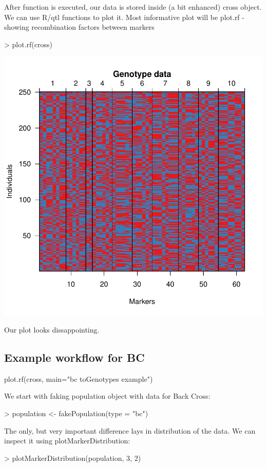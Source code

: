 \documentclass{article}
\begin{document}
{\noindent}After function is executed, our data is stored inside (a bit enhanced) cross object. We can use R/qtl functions to plot it. Most informative plot will be plot.rf - showing recombination factors between markers
\begin{Schunk}
\begin{Sinput}
> plot.rf(cross)
\end{Sinput}
\end{Schunk}
\includegraphics{manual-014}

{\noindent}Our plot looks dissappointing. 
\newpage
\subsection{Example workflow for BC}


	
	plot.rf(cross, main="bc toGenotypes example")

{\noindent}We start with faking population object with data for Back Cross:
\begin{Schunk}
\begin{Sinput}
> population <- fakePopulation(type = "bc")
\end{Sinput}
\end{Schunk}

{\noindent}The only, but very important difference lays in distribution of the data. We can inspect it using plotMarkerDistribution:
\begin{Schunk}
\begin{Sinput}
> plotMarkerDistribution(population, 3, 2)
\end{Sinput}
\end{Schunk}
\end{document}

